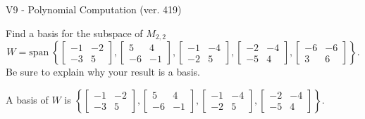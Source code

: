 \begin{exercise}
  \begin{exerciseTitle}V9 - Polynomial Computation (ver. 419)\end{exerciseTitle}
  \begin{exerciseStatement}
    Find a basis for the subspace of \(M_{2,2}\) 
\[W=\mathrm{span}\ \left\{\left[\begin{array}{cc}
-1 & -2 \\
-3 & 5
\end{array}\right] , \left[\begin{array}{cc}
5 & 4 \\
-6 & -1
\end{array}\right] , \left[\begin{array}{cc}
-1 & -4 \\
-2 & 5
\end{array}\right] , \left[\begin{array}{cc}
-2 & -4 \\
-5 & 4
\end{array}\right] , \left[\begin{array}{cc}
-6 & -6 \\
3 & 6
\end{array}\right]\right\}.\]
 Be sure to explain why your result is a basis.


  \end{exerciseStatement}
  \begin{exerciseAnswer}
   A basis of \(W\) is  \(\left\{\left[\begin{array}{cc}
-1 & -2 \\
-3 & 5
\end{array}\right] , \left[\begin{array}{cc}
5 & 4 \\
-6 & -1
\end{array}\right] , \left[\begin{array}{cc}
-1 & -4 \\
-2 & 5
\end{array}\right] , \left[\begin{array}{cc}
-2 & -4 \\
-5 & 4
\end{array}\right]\right\}\).
  


  \end{exerciseAnswer}
\end{exercise}